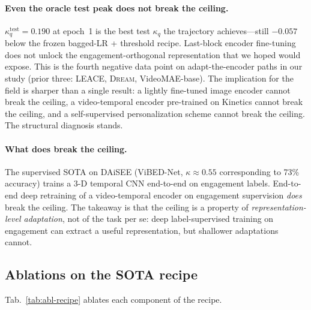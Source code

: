 \paragraph{Even the oracle test peak does not break the ceiling.}
$\kappa_q^{\mathrm{test}} = 0.190$ at epoch~1 is the best test
$\kappa_q$ the trajectory achieves---still $-0.057$ below the
frozen bagged-LR + threshold recipe. Last-block encoder
fine-tuning does not unlock the engagement-orthogonal
representation that we hoped would expose. This is the fourth
negative data point on adapt-the-encoder paths in our study
(prior three: LEACE, \textsc{Dream}, VideoMAE-base). The
implication for the field is sharper than a single result: a
lightly fine-tuned image encoder cannot break the ceiling, a
video-temporal encoder pre-trained on Kinetics cannot break the
ceiling, and a self-supervised personalization scheme cannot
break the ceiling. The structural diagnosis stands.

\paragraph{What does break the ceiling.} The supervised SOTA on
DAiSEE (ViBED-Net, $\kappa \approx 0.55$ corresponding to 73\%
accuracy) trains a 3-D temporal CNN end-to-end on engagement
labels. End-to-end deep retraining of a video-temporal encoder on
engagement supervision \emph{does} break the ceiling. The
takeaway is that the ceiling is a property of
\emph{representation-level adaptation}, not of the task per se:
deep label-supervised training on engagement can extract a useful
representation, but shallower adaptations cannot.

\subsection{Ablations on the SOTA recipe}
\label{sec:abl-recipe}

Tab.~\ref{tab:abl-recipe} ablates each component of the recipe.

